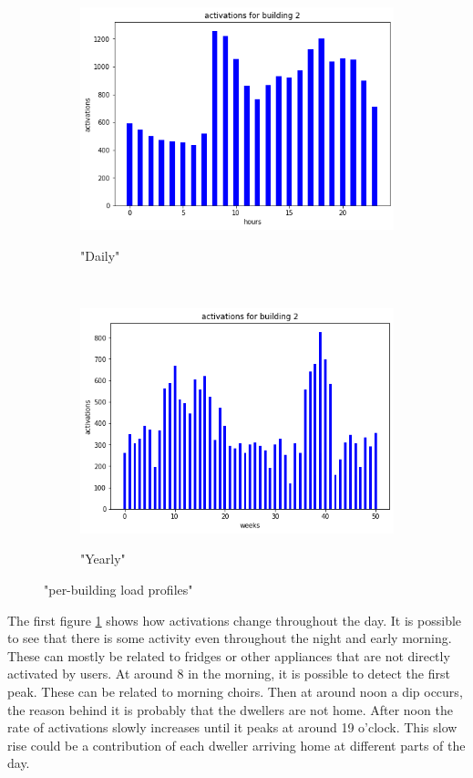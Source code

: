 \begin{figure}[H]
	\begin{subfigure}{.5\textwidth}
		\caption{"Daily"}
		\includegraphics[width=1\linewidth]{../Figures/LPS/SLPdaily2.png}
		\label{fig:SLPdaily2}
	\end{subfigure}%
	~ 
	\begin{subfigure}{.5\textwidth}
		\caption{"Yearly"}
		\includegraphics[width=1\linewidth]{../Figures/LPS/SLPyearly2.png}
		\label{fig:SLPyearly2}
	\end{subfigure}%
	\label{fig:SLP}
	\caption{"per-building load profiles"}
\end{figure}

The first figure \ref{fig:SLPdaily2} shows how activations change throughout the day.
It is possible to see that there is some activity even throughout the night and early morning.
These can mostly be related to fridges or other appliances that are not directly activated by users.
At around 8 in the morning, it is possible to detect the first peak. 
These can be related to morning choirs. 
Then at around noon a dip occurs, the reason behind it is probably that the dwellers are not home.
After noon the rate of activations slowly increases until it peaks at around 19 o'clock. 
This slow rise could be a contribution of each dweller arriving home at different parts of the day.

